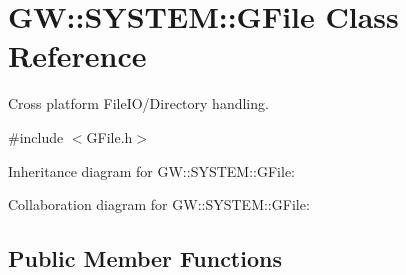 \hypertarget{classGW_1_1SYSTEM_1_1GFile}{}\section{GW\+::S\+Y\+S\+T\+EM\+::G\+File Class Reference}
\label{classGW_1_1SYSTEM_1_1GFile}


Cross platform File\+I\+O/\+Directory handling.  




{\ttfamily \#include $<$G\+File.\+h$>$}



Inheritance diagram for GW\+::S\+Y\+S\+T\+EM\+::G\+File\+:


Collaboration diagram for GW\+::S\+Y\+S\+T\+EM\+::G\+File\+:
\subsection*{Public Member Functions}
